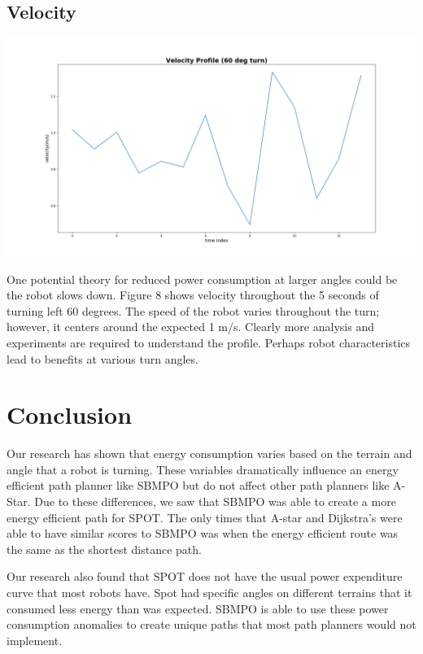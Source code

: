 \documentclass[conference]{IEEEtran}
\begin{document}
    \subsection{Velocity}
    \begin{adjustbox}{center, caption={Velocity profile for a 60 degree (left) turn}, nofloat=figure}
            \includegraphics[width=1\linewidth]{velocity.png}
        \end{adjustbox}
    One potential theory for reduced power consumption at larger angles could be the robot slows down. Figure 8 shows velocity throughout the 5 seconds of turning left 60 degrees. The speed of the robot varies throughout the turn; however, it centers around the expected 1 m/s. Clearly more analysis and experiments are required to understand the profile. Perhaps robot characteristics lead to benefits at various turn angles.
    \noindent
        

\section{Conclusion}

    Our research has shown that energy consumption varies based on the terrain and angle that a robot is turning. These variables dramatically influence an energy efficient path planner like SBMPO but do not affect other path planners like A-Star. Due to these differences, we saw that SBMPO was able to create a more energy efficient path for SPOT. The only times that A-star and Dijkstra's were able to have similar scores to SBMPO was when the energy efficient route was the same as the shortest distance path. 
    
   Our research also found that SPOT does not have the usual power expenditure curve that most robots have. Spot had specific angles on different terrains that it consumed less energy than was expected. SBMPO is able to use these power consumption anomalies to create unique paths that most path planners would not implement. 
 
\end{document}
